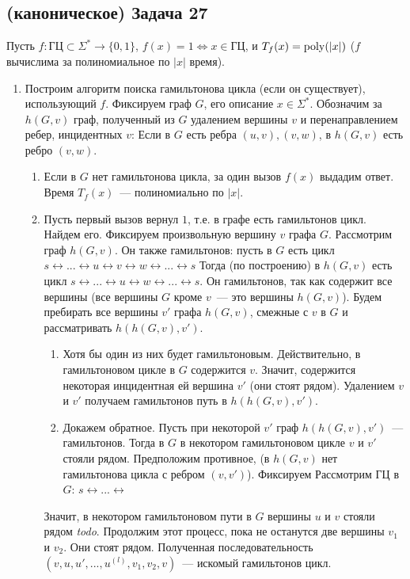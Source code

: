 \documentclass[a4paper]{article}
\def\poly{{\rm{poly}}}
\def\GC{{\mbox{ГЦ}}}
\newcommand{\todo}{{\em todo}}
\begin{document}
\subsection*{(каноническое) Задача 27}
Пусть $f\colon \GC\subset\Sigma^*\to\{0,1\}$, $f(x)=1\Leftrightarrow x\in\GC$, и $T_f(x)=\poly(|x|)$ ($f$ вычислима за полиномиальное по $|x|$ время).
\begin{enumerate}
\item Построим алгоритм поиска гамильтонова цикла (если он существует), использующий $f$. Фиксируем граф $G$, его описание $x\in\Sigma^*$. Обозначим за $h(G, v)$ граф, полученный из $G$ удалением вершины $v$ и перенаправлением ребер, инцидентных $v$: Если в $G$ есть ребра $(u,v), (v, w)$, в $h(G,v)$ есть ребро $(v, w)$.\begin{enumerate}
\item Если в $G$ нет гамильтонова цикла, за один вызов $f(x)$ выдадим ответ. Время $T_f(x)$~--- полиномиально по $|x|$.
\item Пусть первый вызов вернул $1$, т.е. в графе есть гамильтонов цикл. Найдем его. Фиксируем произвольную вершину $v$ графа $G$. Рассмотрим граф $h(G,v)$. Он также гамильтонов: пусть в $G$ есть цикл $s\leftrightarrow...\leftrightarrow u\leftrightarrow v\leftrightarrow w\leftrightarrow...\leftrightarrow s$ Тогда (по построению) в $h(G,v)$ есть цикл $s\leftrightarrow...\leftrightarrow u\leftrightarrow w\leftrightarrow...\leftrightarrow s$. Он гамильтонов, так как содержит все вершины (все вершины $G$ кроме $v$~--- это вершины $h(G,v)$).\newline
Будем пребирать все вершины $v'$ графа $h(G,v)$, смежные с $v$ в $G$ и рассматривать $h(h(G,v),v')$.\begin{enumerate}
\item Хотя бы один из них будет гамильтоновым. Действительно, в гамильтоновом цикле в $G$ содержится $v$. Значит, содержится некоторая инцидентная ей вершина $v'$ (они стоят рядом). Удалением $v$ и $v'$ получаем гамильтонов путь в $h(h(G,v),v')$.
\item Докажем обратное. Пусть при некоторой $v'$ граф $h(h(G,v),v')$~--- гамильтонов. Тогда в $G$ в некотором гамильтоновом цикле $v$ и $v'$ стояли рядом. Предположим противное, (в $h(G,v)$ нет гамильтонова цикла с ребром $(v,v')$). Фиксируем Рассмотрим ГЦ в $G$: $s\leftrightarrow...\leftrightarrow$
\end{enumerate}
Значит, в некотором гамильтоновом пути в $G$ вершины $u$ и $v$ стояли рядом \todo. Продолжим этот процесс, пока не останутся две вершины $v_1$ и $v_2$. Они стоят рядом. Полученная последовательность $(v,u,u',...,u^{(l)},v_1,v_2,v)$~--- искомый гамильтонов цикл.

\end{enumerate}
\end{enumerate}
\end{document}
